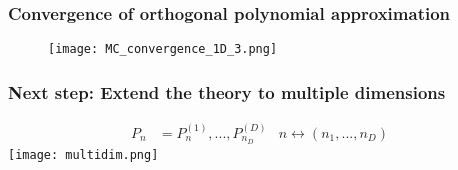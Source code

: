 \documentclass[handout]{beamer}
\begin{document}
\begin{frame}
\frametitle{Convergence of orthogonal polynomial approximation}

  \begin{figure}
    \texttt{[image: MC\_convergence\_1D\_3.png]}
  \end{figure}
   \end{frame}


\begin{frame}
 \frametitle{Next step: Extend the theory to multiple dimensions}
 \pause
  \begin{align*}
  P_n &= P^{(1)}_n, ..., P^{(D)}_{n_D}
  & n\longleftrightarrow (n_1, ..., n_D)
  \end{align*}
  \pause
  \texttt{[image: multidim.png]}

 \end{frame}
\end{document}
